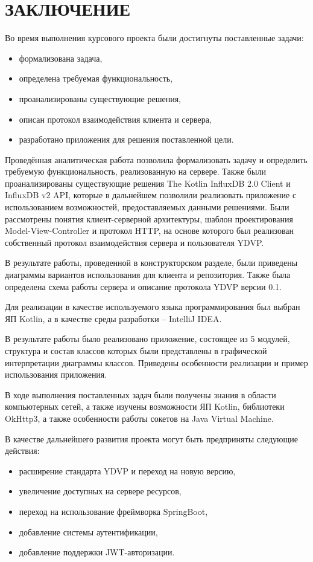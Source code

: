 \section*{ЗАКЛЮЧЕНИЕ}

Во время выполнения курсового проекта были достигнуты поставленные задачи:
\begin{itemize}
\item формализована задача,
\item определена требуемая функциональность,
\item проанализированы существующие решения,
\item описан протокол взаимодействия клиента и сервера,
\item разработано приложения для решения поставленной цели.
\end{itemize}

Проведённая аналитическая работа позволила формализовать задачу и определить требуемую функциональность, реализованную на сервере. Также были проанализированы существующие решения The Kotlin InfluxDB 2.0 Client и InfluxDB v2 API, которые в дальнейшем позволили реализовать приложение с использованием возможностей, предоставляемых данными решениями. Были рассмотрены понятия клиент-серверной архитектуры, шаблон проектирования Model-View-Controller и протокол HTTP, на основе которого был реализован собственный протокол взаимодействия сервера и пользователя YDVP.

В результате работы, проведенной в конструкторском разделе, были приведены диаграммы вариантов использования для клиента и репозитория. Также была определена схема работы сервера и описание протокола YDVP версии 0.1.

Для реализации в качестве используемого языка программирования был выбран ЯП Kotlin, а в качестве среды разработки -- IntelliJ IDEA.

В результате работы было реализовано приложение, состоящее из 5 модулей, структура и состав классов которых были представлены в графической интерпретации диаграммы классов. Приведены особенности реализации и пример использования приложения.

В ходе выполнения поставленных задач были получены знания в области компьютерных сетей, а также изучены возможности ЯП Kotlin, библиотеки OkHttp3, а также особенности работы сокетов на Java Virtual Machine.

В качестве дальнейшего развития проекта могут быть предприняты следующие действия:
\begin{itemize}
\item расширение стандарта YDVP и переход на новую версию,
\item увеличение доступных на сервере ресурсов,
\item переход на использование фреймворка SpringBoot,
\item добавление системы аутентификации,
\item добавление поддержки JWT-авторизации.
\end{itemize}

\pagebreak
